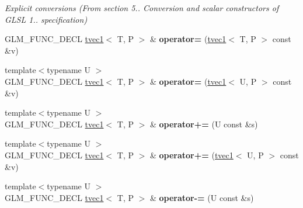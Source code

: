 \begin{DoxyCompactItemize}
\begin{DoxyCompactList}\small\item\em Explicit conversions (From section 5.. Conversion and scalar constructors of G\-L\-S\-L 1.. specification) \end{DoxyCompactList}\item 
\hypertarget{structglm_1_1detail_1_1tvec1_a1e15e21ac8d2986fde39e7553fc41d8a}{G\-L\-M\-\_\-\-F\-U\-N\-C\-\_\-\-D\-E\-C\-L \hyperlink{structglm_1_1detail_1_1tvec1}{tvec1}$<$ T, P $>$ \& {\bfseries operator=} (\hyperlink{structglm_1_1detail_1_1tvec1}{tvec1}$<$ T, P $>$ const \&v)}\label{structglm_1_1detail_1_1tvec1_a1e15e21ac8d2986fde39e7553fc41d8a}

\item 
\hypertarget{structglm_1_1detail_1_1tvec1_ae2928514df11c9bd6a89ed04ee2c57f7}{{\footnotesize template$<$typename U $>$ }\\G\-L\-M\-\_\-\-F\-U\-N\-C\-\_\-\-D\-E\-C\-L \hyperlink{structglm_1_1detail_1_1tvec1}{tvec1}$<$ T, P $>$ \& {\bfseries operator=} (\hyperlink{structglm_1_1detail_1_1tvec1}{tvec1}$<$ U, P $>$ const \&v)}\label{structglm_1_1detail_1_1tvec1_ae2928514df11c9bd6a89ed04ee2c57f7}

\item 
\hypertarget{structglm_1_1detail_1_1tvec1_a6ae40e6821e60a9018d1eb8a1cca3da9}{{\footnotesize template$<$typename U $>$ }\\G\-L\-M\-\_\-\-F\-U\-N\-C\-\_\-\-D\-E\-C\-L \hyperlink{structglm_1_1detail_1_1tvec1}{tvec1}$<$ T, P $>$ \& {\bfseries operator+=} (U const \&s)}\label{structglm_1_1detail_1_1tvec1_a6ae40e6821e60a9018d1eb8a1cca3da9}

\item 
\hypertarget{structglm_1_1detail_1_1tvec1_af5d7976948734a9a514d87d8508ea2ac}{{\footnotesize template$<$typename U $>$ }\\G\-L\-M\-\_\-\-F\-U\-N\-C\-\_\-\-D\-E\-C\-L \hyperlink{structglm_1_1detail_1_1tvec1}{tvec1}$<$ T, P $>$ \& {\bfseries operator+=} (\hyperlink{structglm_1_1detail_1_1tvec1}{tvec1}$<$ U, P $>$ const \&v)}\label{structglm_1_1detail_1_1tvec1_af5d7976948734a9a514d87d8508ea2ac}

\item 
\hypertarget{structglm_1_1detail_1_1tvec1_affba0ab0b93fbaa98d843c89433606f3}{{\footnotesize template$<$typename U $>$ }\\G\-L\-M\-\_\-\-F\-U\-N\-C\-\_\-\-D\-E\-C\-L \hyperlink{structglm_1_1detail_1_1tvec1}{tvec1}$<$ T, P $>$ \& {\bfseries operator-\/=} (U const \&s)}\label{structglm_1_1detail_1_1tvec1_affba0ab0b93fbaa98d843c89433606f3}


\end{DoxyCompactItemize}
